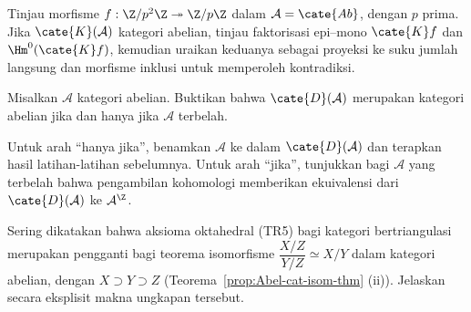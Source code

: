 \begin{Exercises}
	\begin{hint}
		Tinjau morfisme $f:\Z/p^2\Z\twoheadrightarrow\Z/p\Z$ dalam
		$\mathcal{A}=\cate{Ab}$, dengan $p$ prima. Jika
		$\cate{K}(\mathcal{A})$ kategori abelian, tinjau faktorisasi epi--mono
		$\cate{K}f$ dan $\Hm^0(\cate{K}f)$, kemudian uraikan keduanya sebagai
		proyeksi ke suku jumlah langsung dan morfisme inklusi untuk memperoleh
		kontradiksi.
	\end{hint}

	\item Misalkan $\mathcal{A}$ kategori abelian. Buktikan bahwa
	$\cate{D}(\mathcal{A})$ merupakan kategori abelian jika dan hanya jika
	$\mathcal{A}$ terbelah.

	\begin{hint}
		Untuk arah ``hanya jika'', benamkan $\mathcal{A}$ ke dalam
		$\cate{D}(\mathcal{A})$ dan terapkan hasil latihan-latihan sebelumnya.
		Untuk arah ``jika'', tunjukkan bagi $\mathcal{A}$ yang terbelah bahwa
		pengambilan kohomologi memberikan ekuivalensi dari
		$\cate{D}(\mathcal{A})$ ke $\mathcal{A}^{\Z}$.
	\end{hint}

	\item Sering dikatakan bahwa aksioma oktahedral (TR5) bagi kategori
	bertriangulasi merupakan pengganti bagi teorema isomorfisme
	$\dfrac{X/Z}{Y/Z}\simeq X/Y$ dalam kategori abelian, dengan
	$X\supset Y\supset Z$ (Teorema~\ref{prop:Abel-cat-isom-thm} (ii)).
	Jelaskan secara eksplisit makna ungkapan tersebut.


\end{Exercises}
